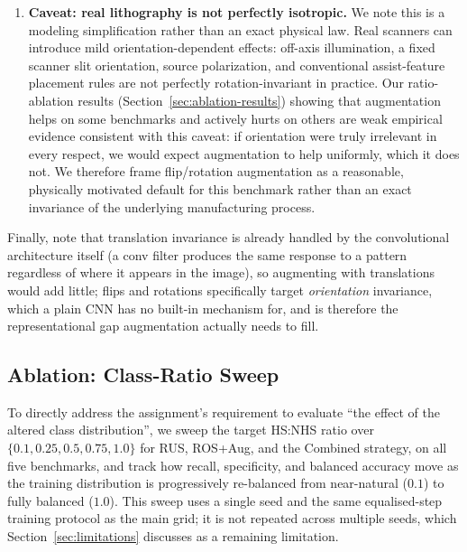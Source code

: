 \documentclass[conference]{IEEEtran}
\begin{document}
\begin{enumerate}
  this exact task.
  \item \textbf{Caveat: real lithography is not perfectly isotropic.}
  We note this is a modeling simplification rather than an exact physical
  law. Real scanners can introduce mild orientation-dependent effects:
  off-axis illumination, a fixed scanner slit orientation, source
  polarization, and conventional assist-feature placement rules are
  not perfectly rotation-invariant in practice. Our ratio-ablation
  results (Section~\ref{sec:ablation-results}) showing that
  augmentation helps on some benchmarks and actively hurts on others
  are weak empirical evidence consistent with this caveat: if
  orientation were truly irrelevant in every respect, we would expect
  augmentation to help uniformly, which it does not. We therefore
  frame flip/rotation augmentation as a reasonable, physically
  motivated default for this benchmark rather than an exact invariance
  of the underlying manufacturing process.
\end{enumerate}

Finally, note that translation invariance is already handled by the
convolutional architecture itself (a conv filter produces the same
response to a pattern regardless of where it appears in the image),
so augmenting with translations would add little; flips and rotations
specifically target \emph{orientation} invariance, which a plain CNN
has no built-in mechanism for, and is therefore the representational
gap augmentation actually needs to fill.

\subsection{Ablation: Class-Ratio Sweep}
\label{sec:ablation}
To directly address the assignment's requirement to evaluate ``the
effect of the altered class distribution'', we sweep the target
HS:NHS ratio over $\{0.1, 0.25, 0.5, 0.75, 1.0\}$ for RUS, ROS+Aug, and
the Combined strategy, on all five benchmarks, and track how recall,
specificity, and balanced accuracy move as the training distribution
is progressively re-balanced from near-natural ($0.1$) to fully
balanced ($1.0$). This sweep uses a single seed and the same
equalised-step training protocol as the main grid; it is not repeated
across multiple seeds, which Section~\ref{sec:limitations} discusses
as a remaining limitation.
\end{document}
